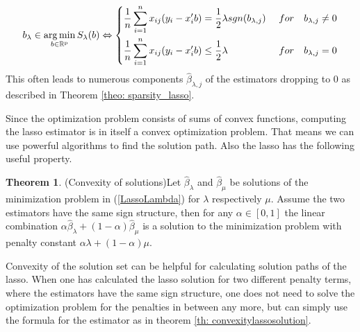 \documentclass{article}
\theoremstyle{definition}
\newtheorem{theorem}{Theorem}
\DeclareMathOperator*{\argmin}{arg\,min}
\begin{document}
\begin{align*}
b_\lambda \in \argmin_{b \in\rm \mathbb{R}^p} S_\lambda(b) \Leftrightarrow \begin{dcases} 
\frac{1}{n}\sum_{i=1}^n x_{ij}(y_i-x_i'b)= \frac{1}{2}\lambda sgn(b_{\lambda,j}) &\ for \quad b_{\lambda,j} \neq0 \\   
\frac{1}{n}\sum_{i=1}^n x_{ij}(y_i-x_i'b) \leq  \frac{1}{2}\lambda \ &\ for \quad b_{\lambda,j}=0
\end{dcases} 
\end{align*}
This often leads to numerous components $\hat\beta_{\lambda,j}$ of the estimators dropping to 0 as described in Theorem \eqref{theo: sparsity_lasso}.


Since the optimization problem consists of sums of convex functions, computing the lasso estimator is in itself a convex optimization problem. That means we can use powerful algorithms to find the solution path. Also the lasso has the following useful property.
\bigskip

\begin{theorem}(Convexity of solutions)\label{th: convexitylassosolution}
	Let $\hat{\beta}_{\lambda}$ and $\hat{\beta}_\mu$ be solutions of the minimization problem in (\ref{LassoLambda}) for $\lambda$ respectively $\mu$. Assume the two estimators have the same sign structure, then for any
	$\alpha\in[0,1]$ the linear combination $\alpha\hat{\beta}_{\lambda}+ (1-\alpha)\hat{\beta}_\mu$ is a solution to the minimization problem with penalty constant $\alpha \lambda + (1-\alpha) \mu$.
\end{theorem}

Convexity of the solution set can be helpful for calculating solution paths of the lasso. When one has calculated the lasso solution for two different penalty terms, where the estimators have the same sign structure, one does not need to solve the optimization problem for the penalties in between any more, but can simply use the formula for the estimator as in theorem \eqref{th: convexitylassosolution}.
\end{document}

